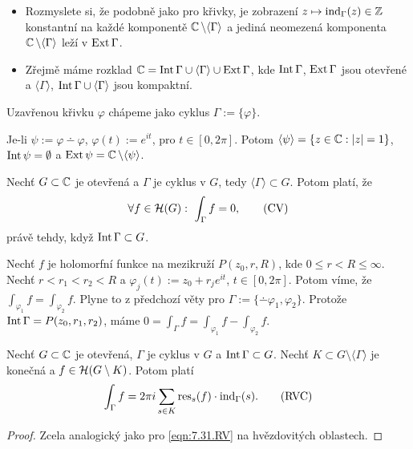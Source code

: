 \begin{note}
\begin{itemize}
    \item Rozmyslete si, že podobně jako pro křivky, je zobrazení $z\mapsto\operatorname{ind}_\Gamma(z)\in\operatorname{\mathbb{Z}}$ konstantní na každé komponentě $\operatorname{\mathbb{C}} \setminus\langle\Gamma\rangle$ a jediná neomezená komponenta $\operatorname{\mathbb{C}} \setminus\langle\Gamma\rangle$ leží v $\operatorname{Ext}\Gamma$.
    \item Zřejmě máme rozklad $\operatorname{\mathbb{C}} =\operatorname{Int}\Gamma\cup\langle\Gamma\rangle\cup\operatorname{Ext} \Gamma$, kde $\operatorname{Int} \Gamma$, $\operatorname{Ext} \Gamma$ jsou otevřené a $\langle\Gamma\rangle$, $\operatorname{Int} \Gamma\cup\langle\Gamma\rangle$ jsou kompaktní.
\end{itemize}
\end{note}

\begin{note}
Uzavřenou křivku $\varphi$ chápeme jako cyklus $\Gamma:=\{\varphi\}$.
\end{note}

\begin{example}
Je-li $\psi:=\varphi\dotminus\varphi$, $\varphi(t):=e^{it}$, pro $t\in[0,2\pi]$. Potom $\langle\psi\rangle=\{z\in\operatorname{\mathbb{C}} : |z|=1\}$, $\operatorname{Int}\psi=\emptyset$ a $\operatorname{Ext}\psi=\operatorname{\mathbb{C}} \setminus\langle\psi\rangle$.
\end{example}

\begin{theorem}\label{thm:obCapC}
Nechť $G\subset\operatorname{\mathbb{C}} $ je otevřená a $\Gamma$ je cyklus v $G$, tedy $\langle\Gamma\rangle\subset G$. Potom platí, že
\begin{equation}
    \forall f\in\Holo(G):\ \int_\Gamma f =0,
    \tag{CV}
    \label{eqn:7.30.cv}
\end{equation}
právě tehdy, když $\operatorname{Int}\Gamma\subset G$.
\end{theorem}

\begin{example}
Nechť $f$ je holomorfní funkce na mezikruží $P(z_0,r,R)$, kde $0\leq r<R\leq\infty$. Nechť $r<r_1<r_2<R$ a $\varphi_j(t):=z_0+r_je^{it}$, $t\in[0,2\pi]$. Potom víme, že $\int_{\varphi_1}f=\int_{\varphi_2}f$. Plyne to z předchozí věty pro $\Gamma:=\{\dotminus\varphi_1,\varphi_2\}$. Protože $\operatorname{Int}\Gamma=P(z_0,r_1,r_2)$, máme $0=\int_\Gamma f = \int_{\varphi_1}f-\int_{\varphi_2}f$.
\end{example}

\begin{theorem}
Nechť $G\subset\operatorname{\mathbb{C}}$ je otevřená, $\Gamma$ je cyklus v $G$ a $\operatorname{Int}\Gamma\subset G$. Nechť $K\subset G\setminus\langle\Gamma\rangle$ je konečná  a $f\in\operatorname{\mathcal{H}}(G\setminus K)$. Potom platí
\begin{equation}
    \int_\Gamma f = 2\pi i  \sum_{s\in K}\operatorname{res}_s(f)\cdot\operatorname{ind}_\Gamma(s).
    \tag{RVC}
    \label{eqn:9.8.rvc}
\end{equation}
\end{theorem}
\begin{proof}
Zcela analogický jako pro \cref{eqn:7.31.RV} na hvězdovitých oblastech.
\end{proof}

